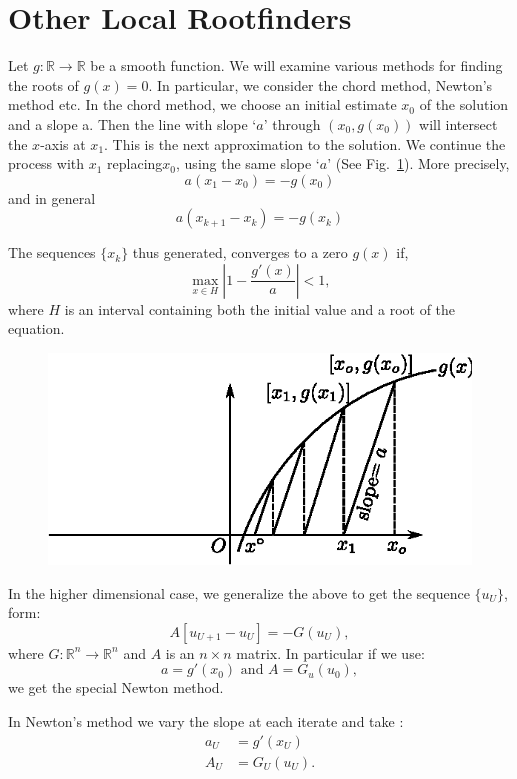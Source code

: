 \setcounter{section}{21}
\section{Other Local Rootfinders}\label{chap2-sec2.22}%

Let  $g : \mathbb{R}\to \mathbb{R} $ be a smooth function. We will
examine various methods for finding the roots of $g(x) = 0$. In
particular, we consider the  chord method, Newton's method etc. In the
chord method, we choose an initial estimate $x_0$ of the solution and
a slope a. Then the line with slope `$a$' through $(x_0, g(x_0))$ will
intersect the $x$-axis at $x_1$. This is the next approximation to
the solution. We continue the process with $x_1$ replacing\pageoriginale $x_0$,
using the same slope `$a$' (See Fig.~\ref{chap2-fig2.3}). More precisely,  
$$
a(x_1 - x_0) = -g(x_0)
$$
and in general  
$$
a(x_{k+1} - x_k)= - g (x_k) 
$$

The sequences $\{ x_k \}$ thus generated, converges to a zero $g(x)$ if,  
$$
\max_{x \in H} \left| 1- \frac{g'(x)}{a} \right| <1,
$$
where $H$ is an interval containing both the initial value and a root
of the equation.  
\begin{figure}[H]
\centering
\includegraphics{vol79-fig/fig79-16.eps}
\smallskip
\caption{}
\label{chap2-fig2.3}
\end{figure}

In the higher dimensional case, we generalize the above to get the
sequence $\{ u_U \}$, form:  
$$
A[u_{U+1} - u_{U}]= -G(u_U),   
$$
where $G : \mathbb{R}^n \to \mathbb{R}^n$ and $A$ is an $n\times n$ 
matrix. In particular if we use:  
$$
a= g'(x_0) \text{ and } A= G_u(u_0),   
$$\pageoriginale
we get the special Newton method.  

In Newton's method we vary the slope at each iterate and take : 
\begin{align*}
a_U &= g'(x_U) \\
A_U &= G_U(u_U). 
\end{align*}

